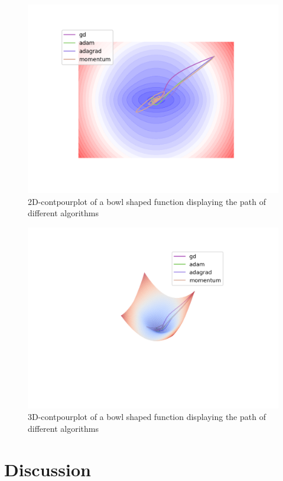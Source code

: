 \documentclass[aodsor,preprint]{imsart}
\numberwithin{equation}{section}
\theoremstyle{plain}
\begin{document}
\begin{figure}[htb]
\centering
\includegraphics[scale=0.7]{images/compare1.png}
\caption{2D-contpourplot of a bowl shaped function displaying the path of different algorithms}
\label{fig:contour1}
\end{figure}

\begin{figure}[htb]
\centering
\includegraphics[scale=0.7]{images/compare2.png}
\caption{3D-contpourplot of a bowl shaped function displaying the path of different algorithms}
\label{fig:contour2}
\end{figure}

\begin{figure}[htb]
\end{figure}


\section{Discussion}



{}
\end{document}
